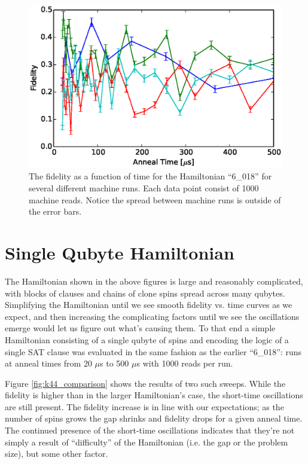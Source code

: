 \begin{figure}
	\includegraphics{img/6_018_comparison.eps}
	\caption[Short Time Fidelities]{The fidelity as a function of time for the Hamiltonian ``6\_018'' for several different machine runs.  Each data point consist of 1000 machine reads.  Notice the spread between machine runs is outside of the error bars.}
	\label{fig:short_fidelity}
\end{figure}

\section{Single Qubyte Hamiltonian}
The Hamiltonian shown in the above figures is large and reasonably complicated, with blocks of clauses and chains of clone spins spread across many qubytes.  Simplifying the Hamiltonian until we see smooth fidelity vs. time curves as we expect, and then increasing the complicating factors until we see the oscillations emerge would let us figure out what's causing them.  To that end a simple Hamiltonian consisting of a single qubyte of spins and encoding the logic of a single SAT clause was evaluated in the same fashion as the earlier ``6\_018'': runs at anneal times from 20 $\mu$s to 500 $\mu$s with 1000 reads per run.  

Figure \ref{fig:k44_comparison} shows the results of two such sweeps.  While the fidelity is higher than in the larger Hamiltonian's case, the short-time oscillations are still present.  The fidelity increase is in line with our expectations; as the number of spins grows the gap shrinks and fidelity drops for a given anneal time.  The continued presence of the short-time oscillations indicates that they're not simply a result of ``difficulty'' of the Hamiltonian (i.e. the gap or the problem size), but some other factor.

